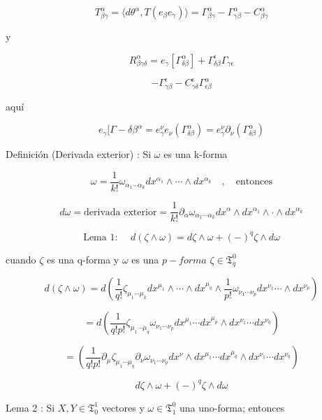 \documentclass{report}
\begin{document}
{\[T_{\beta  \gamma} ^{\alpha} = \langle d \theta^{\alpha} ,T(e_{\beta} e_{\gamma}) \rangle = \Gamma_{\beta \gamma} ^{\alpha} -\Gamma_{\gamma \beta}^{\alpha} - C _{\beta \gamma} ^{\alpha} \]


y

\[ R_{\beta \gamma \delta}^{\alpha } = e_{\gamma}[\Gamma_{\delta \beta} ^{\alpha} ] + \Gamma _{\delta \beta} ^{\epsilon} \Gamma_{\gamma \epsilon } \]

\[-\Gamma_{\gamma\beta}^{\epsilon} - C_{\gamma \delta}^{\epsilon} \Gamma_{\epsilon \beta} ^{\alpha}\]

aquí

\[e_{\gamma} [\Gamma-{\delta \beta}^{\alpha} = e _{\gamma} ^{\nu}e_{\nu} (\Gamma_{\delta \beta} ^{\alpha} ) = e_{\gamma}^{\nu} \partial_{\nu} (\Gamma_{\delta \beta}^{\alpha}) \]

Definición (Derivada exterior) : Si $\omega$ es una k-forma 

\[\omega = \frac{1}{k!} \omega_{\alpha_{1} \cdots \alpha_{k}} dx^{\alpha_{1}} \wedge \cdots \wedge dx^{\alpha_{k}} \quad , \quad \text{entonces} \]

\[d \omega = \text{derivada exterior} = \frac{1}{k!}\partial _{\alpha} \omega_{\alpha_{1} \cdots \alpha_{k}} dx^{\alpha}\wedge dx^{\alpha_1 }\wedge \cdot \wedge dx^{\alpha _{k}}\]

\[\text{Lema 1: } \quad d(\zeta \wedge \omega ) =d \zeta \wedge \omega + (-)^{q} \zeta \wedge d \omega\]

cuando $\zeta$ es una q-forma y $\omega$ es una $p-forma$ $\zeta \in \mathfrak{T}_{q}^{0}$

\[d(\zeta \wedge \omega) =d (\frac{1}{q!} \zeta_{\mu_{1}\cdots \mu_{k}} dx^{\mu_{1}}\wedge \cdots \wedge dx^{\mu_{q}} \wedge \frac{1}{p!} \omega_{\nu_{1}\cdots \nu_{p}} dx^{\nu_{1}} \cdots \wedge dx^{\nu_{p}}) \]

\[= d(\frac{1}{q!p!} \zeta _{\mu_{1} \cdots \mu_{q}} \omega_{\nu_{1} \cdots \nu_{p}} dx^{\mu_{1}} \cdots dx^{\mu_{p}} \wedge dx^{\nu_{1}} \cdots dx^{\nu_{q}}) \]

\[=(\frac{1}{q!p!} \partial_{\mu} \zeta_{\mu_{1} \cdots \mu_{q}} \partial _{\nu} \omega_{\nu_{1}\cdots \nu_{p}} dx^{\nu} \wedge dx^{\mu_{1}} \cdots dx^{\mu_{q}}\wedge dx^{\nu_{1}}\cdots dx^{\nu_{q}})\]

\begin{equation}
d \zeta \wedge \omega + (-)^{q} \zeta \wedge d \omega
\end{equation}

Lema 2 : Si $X ,Y \in \mathfrak{T}_{0}^{1}$ vectores y $\omega \in \mathfrak{T}_{1}^{0}$ una uno-forma; entonces

}
\end{document}
